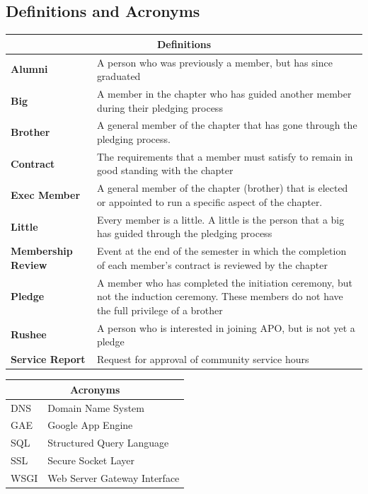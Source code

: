 \documentclass{article}
\begin{document}
\subsection{Definitions and Acronyms}

\begin{tabular}{p{}p{}}

\multicolumn{2}{c}{ {\bf Definitions} } \\ \hline
{\bf Alumni} & A person who was previously a member, but has since graduated\\ \hline
{\bf Big} & A member in the chapter who has guided another member during their pledging process \\ \hline
{\bf Brother} & A general member of the chapter that has gone through the pledging process. \\ \hline
{\bf Contract} & The requirements that a member must satisfy to remain in good standing with the chapter \\ \hline
{\bf Exec Member} & A general member of the chapter (brother) that is elected or appointed to run a specific aspect of the chapter. \\ \hline
{\bf Little} & Every member is a little. A little is the person that a big has guided through the pledging process \\ \hline
{\bf Membership Review} & Event at the end of the semester in which the completion of each member's contract is reviewed by the chapter\\ \hline
{\bf Pledge} & A member who has completed the initiation ceremony, but not the induction ceremony. These members do not have the full privilege of a brother\\ \hline
{\bf Rushee} & A person who is interested in joining APO, but is not yet a pledge \\ \hline
{\bf Service Report} & Request for approval of community service hours\\ \hline
\end{tabular}

\begin{tabular}{p{}p{}}
\multicolumn{2}{c}{ {\bf Acronyms} } \\ \hline
DNS & Domain Name System \\ \hline
GAE & Google App Engine \\ \hline
SQL & Structured Query Language \\ \hline
SSL & Secure Socket Layer \\ \hline
WSGI & Web Server Gateway Interface \\ \hline

\end{tabular}
\end{document}
